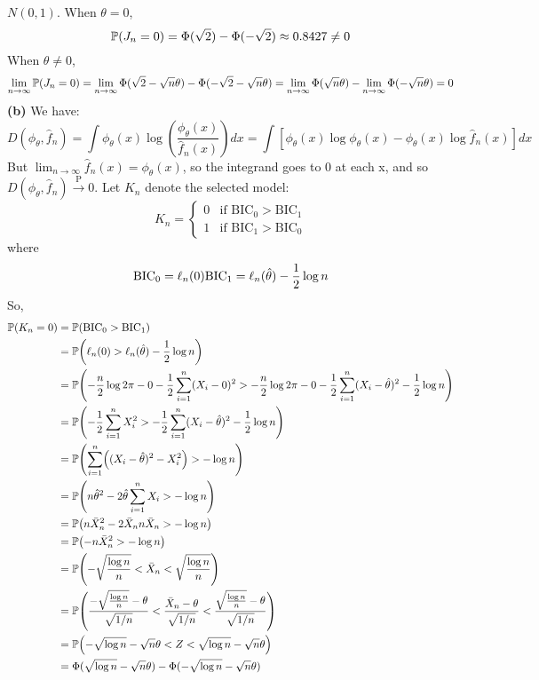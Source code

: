 \(N(0, 1)\).
When \(\theta = 0\),
\[
\operatorname{\mathbb{P}}(J_{n} = 0) = \Phi(\sqrt{2}) - \Phi(-\sqrt{2}) \approx 0.8427 \neq 0
\]
When \(\theta \neq 0\),
\[
\lim_{n \rightarrow \infty} \operatorname{\mathbb{P}}(J_{n} = 0) = \lim_{n \rightarrow \infty}\Phi(\sqrt{2} - \sqrt{n}\theta) - \Phi(-\sqrt{2} - \sqrt{n}\theta) = \lim_{n \rightarrow \infty}\Phi(\sqrt{n}\theta) - \lim_{n \rightarrow \infty}\Phi(-\sqrt{n}\theta) = 0
\]
\textbf{(b)} We have:
\[
D(\phi_\theta, \hat{f}_{n}) = \int \phi_\theta(x) \log \left(\frac{\phi_\theta(x)}{\hat{f}_{n}(x)} \right) dx = \int \left[\phi_\theta(x) \log \phi_\theta(x) - \phi_\theta(x) \log \hat{f}_{n}(x) \right] dx
\]
But \(\lim_{n \rightarrow \infty} \hat{f}_{n}(x) = \phi_\theta(x)\), so
the integrand goes to 0 at each x, and so
\(D(\phi_\theta, \hat{f}_{n}) \xrightarrow{\textrm{P}} 0\).
Let \(K_{n}\) denote the selected model:
\[
K_{n} = \begin{cases}
0 & \text{if } \text{BIC}_{0} > \text{BIC}_{1} \\
1 & \text{if } \text{BIC}_{1} > \text{BIC}_{0}
\end{cases}
\]
where
\[
\text{BIC}_{0} = \ell_{n}(0) \\
\text{BIC}_{1} = \ell_{n}(\hat{\theta}) - \frac{1}{2} \log n
\]
So,
\begin{align*}
\PROB(K_{n} = 0) &= \PROB(\text{BIC}_{0} > \text{BIC}_{1}) \\
&= \PROB\left(\ell_{n}(0) > \ell_{n}(\hat{\theta}) - \frac{1}{2} \log n \right) \\
&= \PROB \left(-\frac{n}{2} \log 2\pi - 0 - \frac{1}{2} \sum_{i=1}^{n} (X_{i} - 0)^{2} > -\frac{n}{2} \log 2\pi - 0 - \frac{1}{2} \sum_{i=1}^{n} (X_{i} - \hat{\theta})^{2} - \frac{1}{2} \log n \right) \\
&= \PROB\left( -\frac{1}{2} \sum_{i=1}^{n} X_{i}^{2} > -\frac{1}{2} \sum_{i=1}^{n} (X_{i} - \hat{\theta})^{2} - \frac{1}{2} \log n\right) \\
&= \PROB\left( \sum_{i=1}^{n} \left((X_{i} - \hat{\theta})^{2} - X_{i}^{2} \right) > -\log n \right) \\
&= \PROB\left( n \hat{\theta}^{2} - 2 \hat{\theta} \sum_{i=1}^{n} X_{i} > -\log n \right) \\
&= \PROB\left( n \bar{X}_{n}^{2} - 2 \bar{X}_{n} n \bar{X}_{n} > -\log n\right) \\
&= \PROB\left( -n \bar{X}_{n}^{2} > -\log n \right) \\
&= \PROB\left(-\sqrt{\frac{\log n}{n}} < \bar{X}_{n} < \sqrt{\frac{\log n}{n}} \right) \\
&= \PROB\left(\frac{-\sqrt{\frac{\log n}{n}} - \theta}{\sqrt{1/n}} < \frac{\bar{X}_{n} - \theta}{\sqrt{1/n}} < \frac{\sqrt{\frac{\log n}{n}} - \theta}{\sqrt{1/n}} \right) \\ 
&=  \PROB\left(-\sqrt{\log n} - \sqrt{n}\theta < Z < \sqrt{\log n} - \sqrt{n}\theta \right) \\
&= \Phi(\sqrt{\log n} - \sqrt{n}\theta) - \Phi(-\sqrt{\log n} - \sqrt{n}\theta)
\end{align*}
